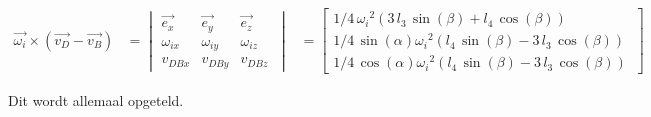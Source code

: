 \begin{equation*}
\begin{split}
\overrightarrow{\omega_{i}}\times(\overrightarrow{v_{D}}-\overrightarrow{v_{B}})
&=	\begin{vmatrix}
	\overrightarrow{e_{x}} & \overrightarrow{e_{y}} & \overrightarrow{e_{z}}\\
	\omega_{ix} & \omega_{iy} & \omega_{iz}\\
	v_{DBx} & v_{DBy} & v_{DBz}\
	\end{vmatrix}
&=	\begin{bmatrix}
	1/4\,{\omega_{i}}^{2} \left( 3\,l_{3}\,\sin\left( \beta \right) +l_{4}\,\cos \left( \beta \right)  \right)\\
	1/4\,\sin \left( \alpha \right) {\omega_{i}}^{2}\left( l_{4}\,\sin \left( \beta \right) -3\,l_{3}\,\cos \left( \beta\right)  \right) \\
	1/4\,\cos \left( \alpha\right) {\omega_{i}}^{2} \left( l_{4}\,\sin \left( \beta \right) -3\,l_{3}\,\cos \left( \beta \right)  \right) \
	\end{bmatrix}
\end{split}
\end{equation*}

Dit wordt allemaal opgeteld.


